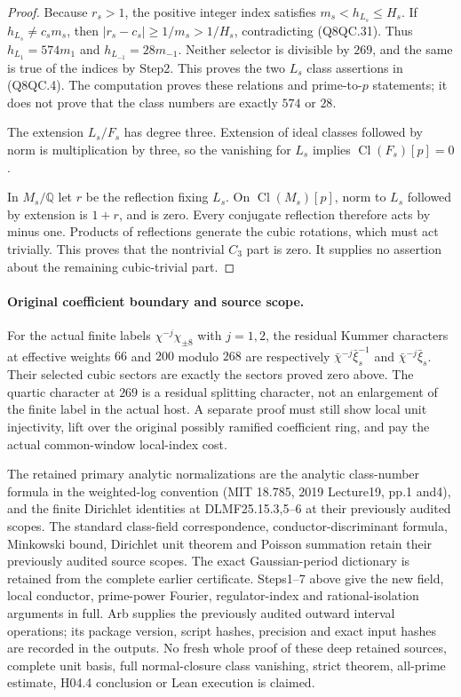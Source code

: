 \begin{proof}
Because $r_s>1$, the positive integer index satisfies
$m_s<h_{L_s}\leq H_s$.
If $h_{L_s}\ne c_sm_s$, then
$|r_s-c_s|\geq1/m_s>1/H_s$, contradicting (Q8QC.31).
Thus $h_{L_1}=574m_1$ and $h_{L_{-1}}=28m_{-1}$.
Neither selector is divisible by $269$, and the same is true
of the indices by Step2.
This proves the two $L_s$ class assertions in (Q8QC.4).
The computation proves these relations and prime-to-$p$ statements;
it does not prove that the class numbers are exactly $574$ or $28$.

The extension $L_s/F_s$ has degree three.
Extension of ideal classes followed by norm is multiplication
by three, so the vanishing for $L_s$ implies
$\operatorname{Cl}(F_s)[p]=0$.

In $M_s/\mathbb Q$ let $r$ be the reflection fixing $L_s$.
On $\operatorname{Cl}(M_s)[p]$, norm to $L_s$ followed by
extension is $1+r$, and is zero.
Every conjugate reflection therefore acts by minus one.
Products of reflections generate the cubic rotations, which
must act trivially.
This proves that the nontrivial $C_3$ part is zero.
It supplies no assertion about the remaining cubic-trivial part.
\end{proof}

\paragraph{Original coefficient boundary and source scope.}
For the actual finite labels $\chi^{-j}\chi_{\pm8}$ with $j=1,2$,
the residual Kummer characters at effective weights $66$ and
$200$ modulo $268$ are respectively
$\bar\chi^{-j}\bar\xi_s^{-1}$ and
$\bar\chi^{-j}\bar\xi_s$.
Their selected cubic sectors are exactly the sectors proved
zero above.  The quartic character at $269$ is a residual
splitting character, not an enlargement of the finite label
in the actual host.
A separate proof must still show local unit injectivity, lift
over the original possibly ramified coefficient ring, and pay
the actual common-window local-index cost.

The retained primary analytic normalizations are the analytic
class-number formula in the weighted-log convention
(MIT 18.785, 2019 Lecture19, pp.1 and4), and the finite
Dirichlet identities at DLMF25.15.3,5--6 at their previously
audited scopes.  The standard class-field correspondence,
conductor-discriminant formula, Minkowski bound, Dirichlet unit
theorem and Poisson summation retain their previously audited
source scopes.
The exact Gaussian-period dictionary is retained from the
complete earlier certificate.
Steps1--7 above give the new field, local conductor,
prime-power Fourier, regulator-index and rational-isolation
arguments in full.
Arb supplies the previously audited outward interval operations;
its package version, script hashes, precision and exact input
hashes are recorded in the outputs.
No fresh whole proof of these deep retained sources, complete
unit basis, full normal-closure class vanishing, strict theorem,
all-prime estimate, H04.4 conclusion or Lean execution is claimed.
